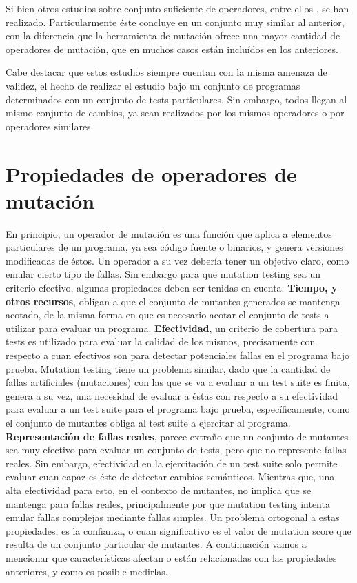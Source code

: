 Si bien otros estudios sobre conjunto suficiente de operadores, entre ellos \cite{bibliography.mutation.selection.ASN2008}, se han realizado. Particularmente \'este concluye en un conjunto muy similar al anterior, con la diferencia que la herramienta de mutaci\'on ofrece una mayor cantidad de operadores de mutaci\'on, que en muchos casos est\'an inclu\'idos en los anteriores.

Cabe destacar que estos estudios siempre cuentan con la misma amenaza de validez, el hecho de realizar el estudio bajo un conjunto de programas determinados con un conjunto de tests particulares. Sin embargo, todos llegan al mismo conjunto de cambios, ya sean realizados por los mismos operadores o por operadores similares.

\section{Propiedades de operadores de mutaci\'on}
\label{sec:preliminares.mutation.opevaluation}

En principio, un operador de mutaci\'on es una funci\'on que aplica a elementos particulares de un programa, ya sea c\'odigo fuente o binarios, y genera versiones modificadas de \'estos. Un operador a su vez deber\'ia tener un objetivo claro, como emular cierto tipo de fallas. Sin embargo para que mutation testing sea un criterio efectivo, algunas propiedades deben ser tenidas en cuenta. \textbf{Tiempo, y otros recursos}, obligan a que el conjunto de mutantes generados se mantenga acotado, de la misma forma en que es necesario acotar el conjunto de tests a utilizar para evaluar un programa. \textbf{Efectividad}, un criterio de cobertura para tests es utilizado para evaluar la calidad de los mismos, precisamente con respecto a cuan efectivos son para detectar potenciales fallas en el programa bajo prueba. Mutation testing tiene un problema similar, dado que la cantidad de fallas artificiales (mutaciones) con las que se va a evaluar a un test suite es finita, genera a su vez, una necesidad de evaluar a \'estas con respecto a su efectividad para evaluar a un test suite para el programa bajo prueba, espec\'ificamente, como el conjunto de mutantes obliga al test suite a ejercitar al programa. \textbf{Representaci\'on de fallas reales}, parece extra\~no que un conjunto de mutantes sea muy efectivo para evaluar un conjunto de tests, pero que no represente fallas reales. Sin embargo, efectividad en la ejercitaci\'on de un test suite solo permite evaluar cuan capaz es \'este de detectar cambios sem\'anticos. Mientras que, una alta efectividad para esto, en el contexto de mutantes, no implica que se mantenga para fallas reales, principalmente por que mutation testing intenta emular fallas complejas mediante fallas simples. Un problema ortogonal a estas propiedades, es la confianza, o cuan significativo es el valor de mutation score que resulta de un conjunto particular de mutantes. A continuaci\'on vamos a mencionar que caracter\'isticas afectan o est\'an relacionadas con las propiedades anteriores, y como es posible medirlas.

